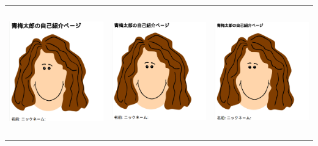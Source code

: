 \documentclass[a4paper,12pt]{jarticle}
\begin{document}
\begin{minipage}{\textwidth}
  \begin{center}
    \tablefirsthead{}
    \tablehead{}
    \tabletail{}
    \tablelasttail{}
    \begin{supertabular}{|m{5.467cm}|m{5.4690003cm}|m{5.4690003cm}}
      \hline
      \centering
      \includegraphics[width=5.373cm,height=5.579cm]{textbook-img225.png}
      &
      \centering
      \includegraphics[width=5.373cm,height=5.579cm]{textbook-img226.png}
      &
\end{supertabular}
\end{center}
\end{minipage}
\end{document}
